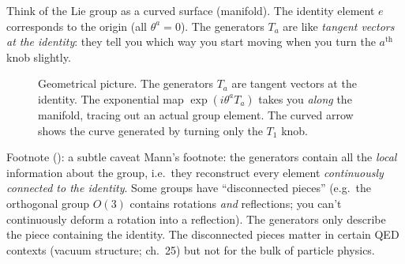 \documentclass[11pt]{article}
\begin{document}
Think of the Lie group as a curved surface (manifold). The identity
element $e$ corresponds to the origin (all $\theta^a = 0$). The
generators $T_a$ are like \emph{tangent vectors at the identity}: they
tell you which way you start moving when you turn the $a^{\text{th}}$
knob slightly.

\begin{figure}[H]
\centering
{}
\caption{Geometrical picture. The generators $T_a$ are tangent vectors at
the identity. The exponential map $\exp(i\theta^a T_a)$ takes you
\emph{along} the manifold, tracing out an actual group element. The
curved arrow shows the curve generated by turning only the $T_1$ knob.}
\end{figure}

\begin{watchbox}{Footnote (\dag\dag): a subtle caveat}
Mann's footnote: the generators contain all the \emph{local} information
about the group, i.e.\ they reconstruct every element \emph{continuously
connected to the identity}. Some groups have ``disconnected pieces''
(e.g.\ the orthogonal group $O(3)$ contains rotations \emph{and}
reflections; you can't continuously deform a rotation into a reflection).
The generators only describe the piece containing the identity. The
disconnected pieces matter in certain QED contexts (vacuum structure;
ch.~25) but not for the bulk of particle physics.
\end{watchbox}
\end{document}
